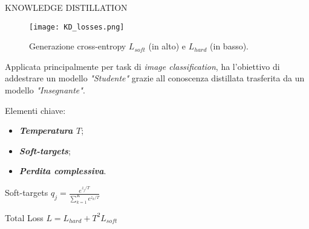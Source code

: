 \begin{frame}{KNOWLEDGE DISTILLATION}
    \begin{figure}
        \centering
        \texttt{[image: KD\_losses.png]}
        \centering
        \caption{Generazione cross-entropy $L_{soft}$ (in alto) e $L_{hard}$ (in basso).}
        \label{l_hard_soft}
    \end{figure}
    \vspace{-0.3cm}
     Applicata principalmente per task di \emph{image classification}, ha l'obiettivo di addestrare un modello \emph{"Studente"} grazie all conoscenza distillata trasferita da un modello \emph{"Insegnante"}.
     \begin{minipage}{\linewidth}
        \centering
        \begin{minipage}{0.45\linewidth}
            Elementi chiave:
            \begin{itemize}
                \item {\bfseries{\emph{Temperatura $T$}}};
                \item {\bfseries{\emph{Soft-targets}}};
                \item {\bfseries{\emph{Perdita complessiva}}}.
            \end{itemize}
        \end{minipage}
        \begin{minipage}{0.40\linewidth}
            \begin{block}{\centering Soft-targets}
                \centering
                $ q_j = \frac{e^{z_j/T}}{\sum_{k=1}^K e^{z_k/T}} $
            \end{block} 
            \begin{block}{\centering Total Loss}
                \centering \small $ L= L_{hard}+T^2L_{soft} $
            \end{block}
        \end{minipage}
    \end{minipage}
\end{frame}